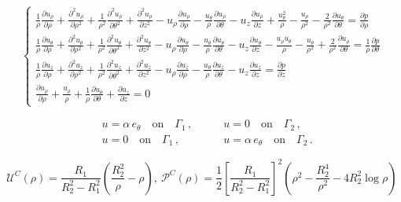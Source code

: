 \documentclass[10pt,a4paper]{amsart}
\def\P{{\mathcal P}}
\def\U{{\mathcal U}}
\begin{document}
	\begin{equation}\label{SNSEcyl}
		\left\{\begin{array}{l}
			\frac{1}{\rho}\frac{\partial u_\rho}{\partial\rho}+\frac{\partial^2 u_\rho}{\partial\rho^2}+\frac{1}{\rho^2}\frac{\partial^2 u_\rho}{\partial\theta^2}+\frac{\partial^2 u_\rho}{\partial z^2}
			-u_\rho\frac{\partial u_\rho}{\partial\rho}-\frac{u_\theta}{\rho}\frac{\partial u_\rho}{\partial\theta}-u_z\frac{\partial u_\rho}{\partial z}
			+\frac{u_\theta^2}{\rho}-\frac{u_\rho}{\rho^2}-\frac{2}{\rho^2}\frac{\partial u_\theta}{\partial\theta}=\frac{\partial p}{\partial\rho}\\[5pt]
			\frac{1}{\rho}\frac{\partial u_\theta}{\partial\rho}+\frac{\partial^2 u_\theta}{\partial\rho^2}
			+\frac{1}{\rho^2}\frac{\partial^2 u_\theta}{\partial\theta^2}+\frac{\partial^2 u_\theta}{\partial z^2}-u_\rho\frac{\partial u_\theta}{\partial\rho}-\frac{u_\theta}{\rho}\frac{\partial u_\theta}{\partial\theta}
			-u_z\frac{\partial u_\theta}{\partial z}-\frac{u_\rho u_\theta}{\rho}-\frac{u_\theta}{\rho^2}+\frac{2}{\rho^2}\frac{\partial u_\rho}{\partial\theta}
			=\frac{1}{\rho}\frac{\partial p}{\partial\theta}\\[5pt]
			\frac{1}{\rho}\frac{\partial u_z}{\partial\rho}+\frac{\partial^2 u_z}{\partial\rho^2}+\frac{1}{\rho^2}\frac{\partial^2 u_z}{\partial\theta^2}+\frac{\partial^2 u_z}{\partial z^2}
			-u_\rho\frac{\partial u_z}{\partial\rho}-\frac{u_\theta}{\rho}\frac{\partial u_z}{\partial\theta}-u_z\frac{\partial u_z}{\partial z}=\frac{\partial p}{\partial z}\\[5pt]
			\frac{\partial u_\rho}{\partial\rho}+\frac{u_\rho}{\rho}+\frac{1}{\rho}\frac{\partial u_\theta}{\partial\theta}
			+\frac{\partial u_z}{\partial z}=0
		\end{array}\right.
	\end{equation}

	\begin{equation}\label{nsstokes0}
		\begin{aligned}
			& u=\alpha \, e_\theta\quad \text{on}\quad \Gamma_1\, ,\qquad & u =0\quad \text{on}\quad \Gamma_2\, ,\\
			& u=0\quad \text{on}\quad \Gamma_1\, ,\qquad & u =\alpha \, e_\theta\quad \text{on}\quad \Gamma_2\, .
		\end{aligned}
	\end{equation}

	\begin{equation} \label{tc1}
		{\U^C}(\rho) =\frac{R_1}{R_2^2 -R_1^2} \left(\frac{R_2^2}{\rho}-\rho\right), \
		\P^C(\rho) =\frac{1}{2}\left[\frac{R_1}{R_2^2-R_1^2}\right]^{2} \left( \rho^{2} - \frac{R_2^4}{\rho^{2}}
		- 4R_2^2 \log\rho \right)\, 
	\end{equation}
\end{document}
